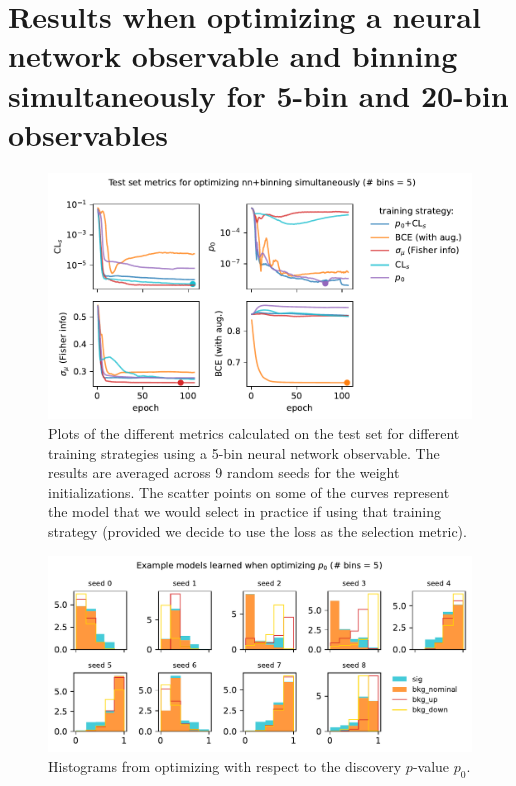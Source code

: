 \documentclass[
  11pt,
  numbers=noendperiod]{book}
\begin{document}
\appendix
{}

\hypertarget{sec-bins-app}{%
\chapter{Results when optimizing a neural network observable and binning
simultaneously for 5-bin and 20-bin observables}\label{sec-bins-app}}


\begin{figure}

{\centering \includegraphics{./images/test_metricsfewbins.pdf}

}

\caption{Plots of the different metrics calculated on the test set for
different training strategies using a 5-bin neural network observable.
The results are averaged across 9 random seeds for the weight
initializations. The scatter points on some of the curves represent the
model that we would select in practice if using that training strategy
(provided we decide to use the loss as the selection metric).}

\end{figure}


\begin{figure}

{\centering \includegraphics{./images/new-hist-models-discovery-5bin.pdf}

}

\caption{Histograms from optimizing with respect to the discovery
\(p\)-value \(p_0\).}

\end{figure}
\end{document}
